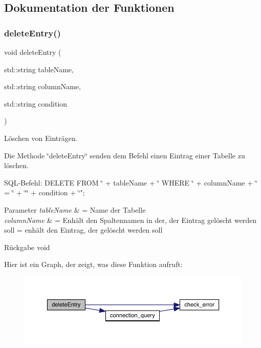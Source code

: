 \subsection{Dokumentation der Funktionen}
\mbox{\label{entry_8cpp_a1ea4c59c6377c754fd0264b58f476685}} 
\subsubsection{delete\+Entry()}
{\footnotesize\ttfamily void delete\+Entry (\begin{DoxyParamCaption}\item[{std\+::string}]{table\+Name,  }\item[{std\+::string}]{column\+Name,  }\item[{std\+::string}]{condition }\end{DoxyParamCaption})}



Löschen von Einträgen. 

Die Methode \char`\"{}delete\+Entry\char`\"{} senden dem Befehl einen Eintrag einer Tabelle zu löschen.~\newline


S\+Q\+L-\/\+Befehl\+: D\+E\+L\+E\+TE F\+R\+OM \char`\"{} + table\+Name + \char`\"{} W\+H\+E\+RE \char`\"{} + column\+Name + \char`\"{} = \char`\"{} + \char`\"{}\textquotesingle{}\char`\"{} + condition + \char`\"{}\textquotesingle{}";


\begin{DoxyParams}{Parameter}
{\em table\+Name} & = Name der Tabelle \\
\hline
{\em column\+Name} & = Enhält den Spaltennamen in der, der Eintrag gelöscht werden soll  = enhält den Eintrag, der gelöscht werden soll\\
\hline
\end{DoxyParams}
\begin{DoxyReturn}{Rückgabe}
void 
\end{DoxyReturn}
Hier ist ein Graph, der zeigt, was diese Funktion aufruft\+:\nopagebreak
\begin{figure}[H]
\begin{center}
\leavevmode
\includegraphics[width=350pt]{entry_8cpp_a1ea4c59c6377c754fd0264b58f476685_cgraph}
\end{center}
\end{figure}
\mbox{\label{entry_8cpp_ab254b5514a4950c7479bc4d513c438dc}} 
